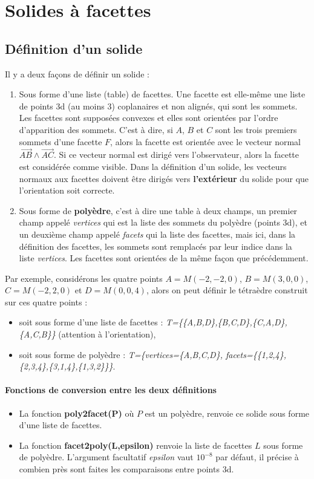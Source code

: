 \documentclass[%
10pt,%
a4paper,%
french,%
]%
{article}%
\begin{document}
\section{Solides à facettes}

\subsection{Définition d'un solide}

Il y a deux façons de définir un solide :
\begin{enumerate}
    \item Sous forme d'une liste (table) de facettes. Une facette est elle-même une liste de points 3d (au moins 3) coplanaires et non alignés, qui sont les sommets. Les facettes sont supposées convexes et elles sont orientées par l'ordre d'apparition des sommets. C'est à dire, si $A$, $B$ et $C$ sont les trois premiers sommets d'une facette $F$, alors la facette est orientée avec le vecteur normal $\vec{AB}\wedge\vec{AC}$. Si ce vecteur normal est dirigé vers l'observateur, alors la facette est considérée comme visible. Dans la définition d'un solide, les vecteurs normaux aux facettes doivent être dirigés vers \textbf{l'extérieur} du solide pour que l'orientation soit correcte.
    
    \item Sous forme de \textbf{polyèdre}, c'est à dire une table à deux champs, un premier champ appelé \emph{vertices} qui est la liste des sommets du polyèdre (points 3d), et un deuxième champ appelé \emph{facets} qui la liste des facettes, mais ici, dans la définition des facettes, les sommets sont remplacés par leur indice dans la liste \emph{vertices}. Les facettes sont orientées de la même façon que précédemment.
\end{enumerate}

Par exemple, considérons les quatre points $A=M(-2,-2,0)$, $B=M(3,0,0)$, $C=M(-2,2,0)$ et $D=M(0,0,4)$, alors on peut définir le tétraèdre construit sur ces quatre points :
\begin{itemize}
    \item soit sous forme d'une liste de facettes : \emph{T=\{\{A,B,D\},\{B,C,D\},\{C,A,D\},\{A,C,B\}\}} (attention à l'orientation),
    \item soit sous forme de polyèdre : 
    \emph{T=\{vertices=\{A,B,C,D\}, facets=\{\{1,2,4\},\{2,3,4\},\{3,1,4\},\{1,3,2\}\}\}}.
\end{itemize}

\paragraph{Fonctions de conversion entre les deux définitions}
\begin{itemize}
    \item La fonction \textbf{poly2facet(P)} où $P$ est un polyèdre, renvoie ce solide sous forme d'une liste de facettes.
    \item La fonction \textbf{facet2poly(L,epsilon)} renvoie la liste de facettes $L$ sous forme de polyèdre. L'argument facultatif \emph{epsilon} vaut $10^{-8}$ par défaut, il précise à combien près sont faites les comparaisons entre points 3d.
\end{itemize}
\end{document}
